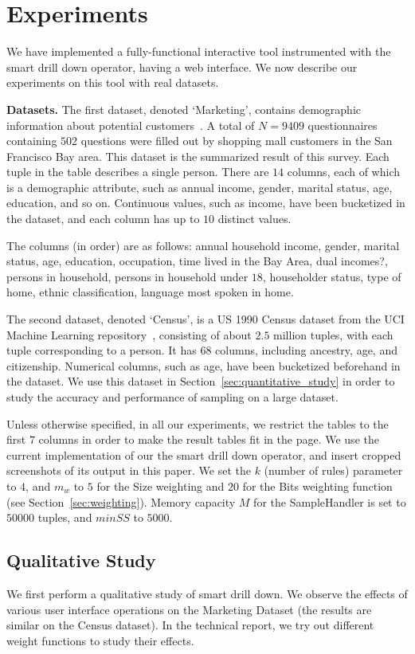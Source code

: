 \documentclass[10pt,journal,compsoc]{IEEEtran}
\newcommand{\stitle}[1]{\vspace{0.5em}\noindent\textbf{#1}}
\newcommand{\papertext}[1]{#1}
\newcommand{\techreporttext}[1]{}
\begin{document}
\section{Experiments}\label{sec:experiments}
We have implemented a fully-functional interactive tool instrumented with the smart drill down operator, having a web interface.
We now describe our experiments on this tool with real datasets.

\stitle{Datasets.} The first dataset, denoted `Marketing', contains demographic information about potential customers~\cite{dataset1}. A total of $N=9409$ questionnaires containing $502$ questions were filled out by shopping mall customers in the San Francisco Bay area. This dataset is the summarized result of this survey. Each tuple in the table describes a single person. There are $14$ columns, each of which is a demographic attribute, such as annual income, gender, marital status, age, education, and so on. Continuous values, such as income, have been bucketized in the dataset, and each column has up to $10$ distinct values.

The columns (in order) are as follows:
annual household income, gender, marital status, age, education, occupation, time lived in the Bay Area, dual incomes?, persons in household, persons in household under $18$, householder status, type of home, ethnic classification, language most spoken in home.

The second dataset, denoted `Census', is a US 1990 Census dataset from the UCI Machine Learning repository~\cite{uciml},
consisting of about $2.5$ million tuples, with each tuple corresponding to a person. It has $68$ columns, including ancestry, age, and citizenship. Numerical columns, such as age, have been bucketized beforehand in the dataset. We use this dataset in Section~\ref{sec:quantitative_study} in order to study the accuracy and performance of sampling on a large dataset.

Unless otherwise specified, in all our experiments, we restrict the tables to the first $7$ columns in order to make the result tables fit in the page. We use the current implementation of our the smart drill down operator, and insert cropped screenshots of its output in this paper. 
We set the $k$ (number of rules) parameter to $4$, and $m_w$ to $5$ for the Size weighting and $20$ for the Bits weighting function (see Section~\ref{sec:weighting}). Memory capacity $M$ for the SampleHandler is set to $50000$ tuples, and $minSS$ to $5000$.


\subsection{Qualitative Study}\label{sec:exp_qualitative}
We first perform a qualitative study of smart drill down. We observe the effects of various user interface operations on the Marketing Dataset (the results are similar on the Census dataset)\techreporttext{, and then try out different weight functions to study their effects}. \papertext{In the technical report, we try out different weight functions to study their effects.}
\end{document}
